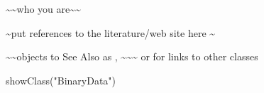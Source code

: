 \begin{Author}\relax
\textasciitilde{}\textasciitilde{}who you are\textasciitilde{}\textasciitilde{}
\end{Author}
\begin{References}\relax
\textasciitilde{}put references to the literature/web site here \textasciitilde{}
\end{References}
\begin{SeeAlso}\relax
\textasciitilde{}\textasciitilde{}objects to See Also as , \textasciitilde{}\textasciitilde{}\textasciitilde{}
or  for links to other classes
\end{SeeAlso}
\begin{Examples}
\begin{ExampleCode}
showClass("BinaryData")
\end{ExampleCode}
\end{Examples}

